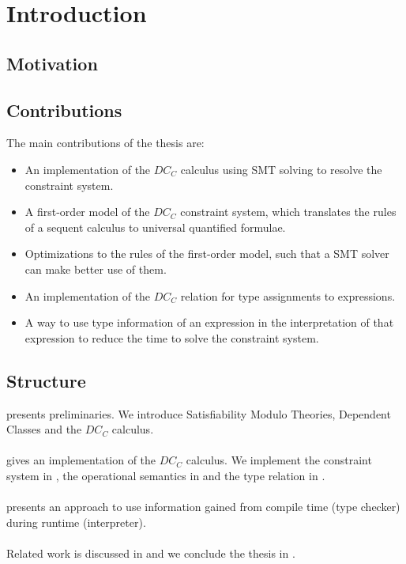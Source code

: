 \chapter{Introduction}
\section{Motivation}
\section{Contributions}
The main contributions of the thesis are:
\begin{itemize}
  \item An implementation of the $DC_C$ calculus
        using SMT solving to resolve the constraint system.
  \item A first-order model of the $DC_C$ constraint system,
        which translates the rules of a sequent calculus
        to universal quantified formulae.
  \item Optimizations to the rules of the first-order model,
        such that a SMT solver can make better use of them.
  \item An implementation of the $DC_C$ relation for
        type assignments to expressions.
  \item A way to use type information of an expression
        in the interpretation of that expression
        to reduce the time to solve the constraint system.
\end{itemize}

\section{Structure}
 presents preliminaries.
We introduce Satisfiability Modulo Theories,
Dependent Classes and the $DC_C$ calculus.\\
\\
 gives an implementation of the $DC_C$ calculus.
We implement
the constraint system in ,
the operational semantics in  and
the type relation in .\\
\\
 presents an approach
to use information gained from compile time (type checker)
during runtime (interpreter).\\
\\
Related work is discussed in 
and we conclude the thesis in .

